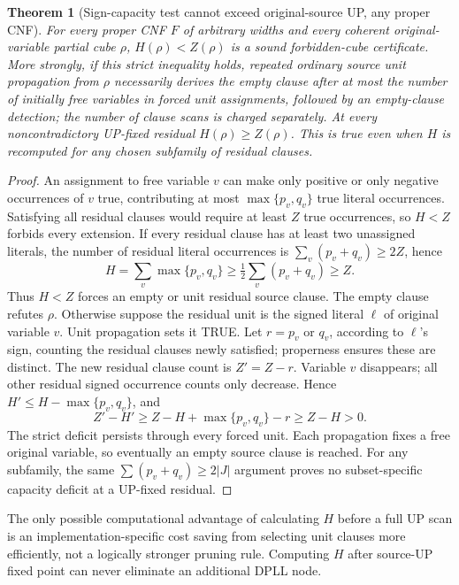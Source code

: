 \documentclass[10pt]{article}
\newtheorem{theorem}{Theorem}
\begin{document}
\begin{theorem}[Sign-capacity test cannot exceed original-source UP, any proper CNF]\label{thm:cap}
For every proper CNF $F$ of arbitrary widths and every coherent original-variable partial cube $\rho$, $H(\rho)<Z(\rho)$ is a sound forbidden-cube certificate. More strongly, if this strict inequality holds, repeated \emph{ordinary source unit propagation} from $\rho$ necessarily derives the empty clause after at most the number of initially free variables in forced unit assignments, followed by an empty-clause detection; the number of clause scans is charged separately. At every noncontradictory UP-fixed residual $H(\rho)\ge Z(\rho)$. This is true even when $H$ is recomputed for \emph{any chosen subfamily} of residual clauses.
\end{theorem}
\begin{proof}
An assignment to free variable $v$ can make only positive or only negative occurrences of $v$ true, contributing at most $\max\{p_v,q_v\}$ true literal occurrences. Satisfying all residual clauses would require at least $Z$ true occurrences, so $H<Z$ forbids every extension.
If every residual clause has at least two unassigned literals, the number of residual literal occurrences is $\sum_v(p_v+q_v)\ge2Z$, hence
\[
 H=\sum_v\max\{p_v,q_v\}\ge\tfrac12\sum_v(p_v+q_v)\ge Z.
\]
Thus $H<Z$ forces an empty or unit residual source clause. The empty clause refutes $\rho$. Otherwise suppose the residual unit is the signed literal $\ell$ of original variable $v$. Unit propagation sets it TRUE. Let $r=p_v$ or $q_v$, according to $\ell$'s sign, counting the residual clauses newly satisfied; properness ensures these are distinct. The new residual clause count is $Z'=Z-r$. Variable $v$ disappears; all other residual signed occurrence counts only decrease. Hence $H'\le H-\max\{p_v,q_v\}$, and
\[
 Z'-H'\ge Z-H+\max\{p_v,q_v\}-r\ge Z-H>0.
\]
The strict deficit persists through every forced unit. Each propagation fixes a free original variable, so eventually an empty source clause is reached. For any subfamily, the same $\sum(p_v+q_v)\ge2|J|$ argument proves no subset-specific capacity deficit at a UP-fixed residual.
\end{proof}
The only possible computational advantage of calculating $H$ before a full UP scan is an implementation-specific cost saving from selecting unit clauses more efficiently, not a logically stronger pruning rule. Computing $H$ after source-UP fixed point can never eliminate an additional DPLL node.
\end{document}
